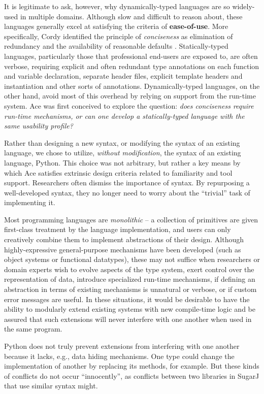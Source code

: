 \documentclass[9pt,preprint]{sigplanconf}
\begin{document}
It is legitimate to ask, however, why dynamically-typed languages are so widely-used in multiple domains. Although slow and difficult to reason about, these languages generally excel at satisfying the criteria of \textbf{ease-of-use}. More specifically, Cordy identified the principle of \emph{conciseness} as elimination of
redundancy and the availability of reasonable defaults \cite{cordy1992hints}. Statically-typed languages, particularly those that professional end-users are exposed to, are often verbose, requiring explicit and often redundant type annotations on each function and variable declaration, separate header files, explicit template headers and  instantiation and other sorts of annotations.  Dynamically-typed languages, on the other hand, avoid most of this overhead by relying on support from the run-time system. Ace was first conceived to explore the question: \emph{does conciseness require run-time mechanisms, or can one develop a statically-typed language with the same usability profile?}


Rather than designing a new syntax, or modifying the syntax of an existing language, we chose to utilize, \emph{without modification}, the syntax of an existing language, Python. This choice was not arbitrary, but rather a key means by which Ace satisfies extrinsic design criteria related to familiarity and tool support. Researchers often dismiss the importance of syntax. By repurposing a well-developed syntax, they no longer need to worry about the ``trivial'' task of implementing it.

Most programming languages are {\em monolithic} -- a collection of primitives are given first-class treatment by the language implementation, and users can only creatively combine them to implement  abstractions of their design. Although highly-expressive general-purpose mechanisms have been developed (such as object systems or functional datatypes), these may not suffice when researchers or domain experts wish to evolve aspects of the type system, exert control over the representation of data, introduce specialized run-time mechanisms, if defining an abstraction in terms of existing mechanisms is unnatural or verbose, or if custom error messages are useful. In these situations, it would be desirable to have the ability to modularly extend existing systems with new compile-time logic and be assured that such extensions will never interfere with one another when used in the same program.

Python does not truly prevent extensions from interfering with one another because it lacks, e.g., data hiding mechanisms. One type could change the implementation of another by replacing its methods, for example. But these kinds of conflicts do not occur ``innocently'', as conflicts between two libraries in SugarJ that use similar syntax might.
 
\end{document}
